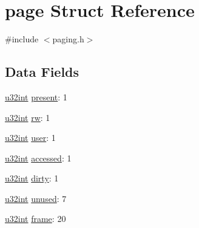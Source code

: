 \hypertarget{structpage}{
\section{page Struct Reference}
\label{structpage}
}


{\ttfamily \#include $<$paging.h$>$}

\subsection*{Data Fields}
\begin{DoxyCompactItemize}
\item 
\hyperlink{library_8h_ad7ecf93b77285d9bf039d27fa3f1a588}{u32int} \hyperlink{structpage_a69718d61bbe7faf204d90744c9824c52}{present}: 1
\item 
\hyperlink{library_8h_ad7ecf93b77285d9bf039d27fa3f1a588}{u32int} \hyperlink{structpage_aee8462b2cc9476e2cc00f55889a8b8d6}{rw}: 1
\item 
\hyperlink{library_8h_ad7ecf93b77285d9bf039d27fa3f1a588}{u32int} \hyperlink{structpage_a9b87f54b0a35d500f320ab6f180e4f1c}{user}: 1
\item 
\hyperlink{library_8h_ad7ecf93b77285d9bf039d27fa3f1a588}{u32int} \hyperlink{structpage_afb99a0327fa4c7332208a4c69586c8ec}{accessed}: 1
\item 
\hyperlink{library_8h_ad7ecf93b77285d9bf039d27fa3f1a588}{u32int} \hyperlink{structpage_a3a32ba260115f27563a8197f17c291a6}{dirty}: 1
\item 
\hyperlink{library_8h_ad7ecf93b77285d9bf039d27fa3f1a588}{u32int} \hyperlink{structpage_ad9ac8c5c64c1eebd1789bcc17df7fb47}{unused}: 7
\item 
\hyperlink{library_8h_ad7ecf93b77285d9bf039d27fa3f1a588}{u32int} \hyperlink{structpage_a2296b5820c02104f91cd25027910c8c0}{frame}: 20
\end{DoxyCompactItemize}


